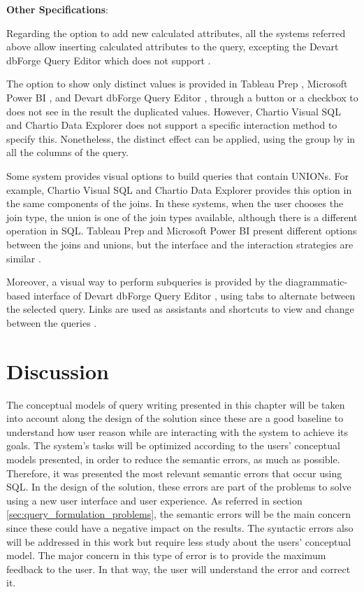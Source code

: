 \textbf{Other Specifications}: 

Regarding the option to add new calculated attributes, all the systems referred above allow inserting calculated attributes to the query, excepting the Devart dbForge Query Editor which does not support \cite{visualSqlActions} \cite{tableauCalculatedField} \cite{powerBICommonQueryTasks}.

The option to show only distinct values is provided in Tableau Prep \cite{tableauPrep}, Microsoft Power BI \cite{powerBI}, and Devart dbForge Query Editor \cite{dbForgeQueryBuilder}, through a button or a checkbox to does not see in the result the duplicated values. However, Chartio Visual SQL \cite{chartioVisualSQL} and Chartio Data Explorer \cite{chartioDataExplorer} does not support a specific interaction method to specify this. Nonetheless, the distinct effect can be applied, using the group by in all the columns of the query.

Some system provides visual options to build queries that contain UNIONs. For example, Chartio Visual SQL \cite{chartioVisualSQL} and Chartio Data Explorer \cite{chartioDataExplorer} provides this option in the same components of the joins. In these systems, when the user chooses the join type, the union is one of the join types available, although there is a different operation in SQL. Tableau Prep \cite{tableauPrep} and Microsoft Power BI \cite{powerBI} present different options between the joins and unions, but the interface and the interaction strategies are similar \cite{tableauAggregateJoinOrUnionData} \cite{powerBIShapeAndCombineData}.

Moreover, a visual way to perform subqueries is provided by the diagrammatic-based interface of Devart dbForge Query Editor \cite{dbForgeQueryBuilder}, using tabs to alternate between the selected query. Links are used as assistants and shortcuts to view and change between the queries \cite{dbForgeSubqueriesOverview} \cite{dbForgeSubqueriesInFromClauses}.

\section{Discussion}
\label{sec:discussion}
The conceptual models of query writing presented in this chapter will be taken into account along the design of the solution since these are a good baseline to understand how user reason while are interacting with the system to achieve its goals. The system's tasks will be optimized according to the users' conceptual models presented, in order to reduce the semantic errors, as much as possible. Therefore, it was presented the most relevant semantic errors that occur using SQL. In the design of the solution, these errors are part of the problems to solve using a new user interface and user experience. As referred in section \ref{sec:query_formulation_problems}, the semantic errors will be the main concern since these could have a negative impact on the results. The syntactic errors also will be addressed in this work but require less study about the users’ conceptual model. The major concern in this type of error is to provide the maximum feedback to the user. In that way, the user will understand the error and correct it.

